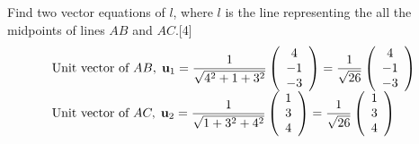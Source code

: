 \documentclass[12pt, a4 paper]{article}
\begin{document}
\begin{outline}[enumerate]
					\2 Find two vector equations of $l$, where $l$ is the line representing the all the midpoints of lines $AB$ and $AC$.\hfill[4]
					\color{blue}
					\[\begin{array}{l}{\textrm{Unit vector of }}AB,\;{{\bf{u}}_1} = \dfrac{1}{{\sqrt {{4^2} + 1 + {3^2}} }}\left( {\begin{array}{*{20}{c}}4\\{ - 1}\\{ - 3}\end{array}} \right) = \dfrac{1}{{\sqrt {26} }}\left( {\begin{array}{*{20}{c}}4\\{ - 1}\\{ - 3}\end{array}} \right)\\{\textrm{Unit vector of }}AC,\;{{\bf{u}}_2} = \dfrac{1}{{\sqrt {1 + {3^2} + {4^2}} }}\left( {\begin{array}{*{20}{c}}1\\3\\4\end{array}} \right) = \dfrac{1}{{\sqrt {26} }}\left( {\begin{array}{*{20}{c}}1\\3\\4\end{array}} \right)\end{array}\]

\end{outline}
\end{document}
